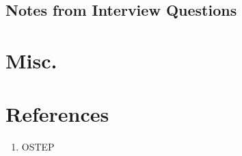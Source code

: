 \documentclass[10pt]{report}
\begin{document}
\section{Notes from Interview Questions}
\chapter{Misc.}
\chapter{References}
\begin{enumerate}
\item OSTEP
\end{enumerate}
\end{document}
